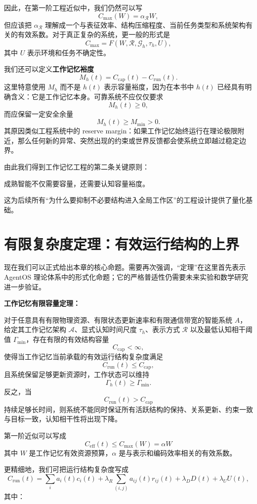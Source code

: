 因此，在第一阶工程近似中，我们仍然可以写
\[
C_{\max}(W)
=
\alpha_{\mathcal R} W,
\]
但应该把 $\alpha_{\mathcal R}$ 理解成一个与表征效率、结构压缩程度、当前任务类型和系统架构有关的有效系数。对于真正复杂的系统，更一般的形式是
\[
C_{\max}
=
F
\left(
W,
\mathcal R,
\mathcal G_h,
\tau_h,
U
\right),
\]
其中 $U$ 表示环境和任务不确定性。

我们还可以定义\textbf{工作记忆裕度}
\[
M_h(t)
=
C_{\mathrm{cap}}(t)
-
C_{\mathrm{run}}(t).
\]
这里特意使用 $M_h$ 而不是 $h(t)$ 表示容量裕度，因为在本书中 $h(t)$ 已经具有明确含义：它是工作记忆本身。可靠系统不应仅仅要求
\[
M_h(t)\geq0,
\]
而应保留一定安全余量
\[
M_h(t)\geq M_{\min}>0.
\]
其原因类似工程系统中的 reserve margin：如果工作记忆始终运行在理论极限附近，那么任何新的异常、突然出现的约束或世界反馈都会使系统立即越过稳定边界。

由此我们得到工作记忆工程的第二条关键原则：
\begin{proposition*}
成熟智能不仅需要容量，还需要认知容量裕度。
\end{proposition*}
这为后续所有“为什么要抑制不必要结构进入全局工作区”的工程设计提供了量化基础。


\section{有限复杂度定理：有效运行结构的上界}
\label{sec:finite-complexity-theorem}

现在我们可以正式给出本章的核心命题。需要再次强调，“定理”在这里首先表示 AgentOS 理论体系中的形式化命题；它的严格普适性仍需要未来实验和数学研究进一步验证。

\textbf{工作记忆有限容量定理：}

对于任意具有有限物理资源、有限状态更新速率和有限通信带宽的智能系统 $A$，给定其工作记忆架构 $\mathcal A$、显式认知时间尺度 $\tau_h$、表示方式 $\mathcal R$ 以及最低认知相干阈值 $\Gamma_{\min}$，存在有限的有效结构容量
\[
C_{\mathrm{cap}}
<
\infty,
\]
使得当工作记忆当前承载的有效运行结构复杂度满足
\[
C_{\mathrm{run}}(t)
\leq
C_{\mathrm{cap}},
\]
且系统保留足够更新资源时，工作状态可以维持
\[
\Gamma_h(t)
\geq
\Gamma_{\min}.
\]
反之，当
\[
C_{\mathrm{run}}(t)
>
C_{\mathrm{cap}}
\]
持续足够长时间，则系统不能同时保证所有活跃结构的保持、关系更新、约束一致与目标一致，认知相干性将出现下降。

第一阶近似可以写成
\[
\boxed{
C_{\mathrm{eff}}(t)
\leq
C_{\max}(W)
=
\alpha W
}
\]
其中 $W$ 是工作记忆有效资源预算，$\alpha$ 是与表示和编码效率相关的有效系数。

更精细地，我们可把运行结构复杂度写成
\[
C_{\mathrm{run}}(t)
=
\sum_i
a_i(t)c_i(t)
+
\lambda_R
\sum_{(i,j)}
a_{ij}(t)r_{ij}(t)
+
\lambda_D D(t)
+
\lambda_U U(t),
\]
其中：

